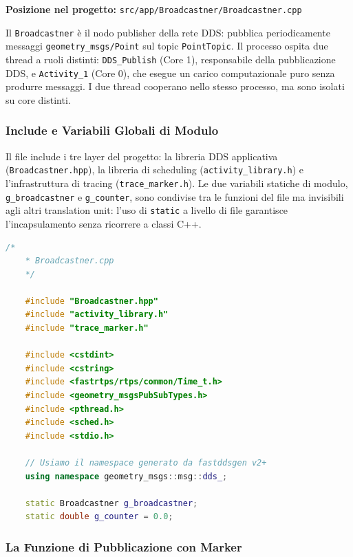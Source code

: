 \noindent\textbf{Posizione nel progetto:} \texttt{src/app/Broadcastner/Broadcastner.cpp}

\bigskip

Il \texttt{Broadcastner} è il nodo publisher della rete DDS: pubblica periodicamente
messaggi \texttt{geometry\_msgs/Point} sul topic \texttt{PointTopic}. Il processo
ospita due thread a ruoli distinti: \texttt{DDS\_Publish} (Core 1), responsabile
della pubblicazione DDS, e \texttt{Activity\_1} (Core 0), che esegue un carico
computazionale puro senza produrre messaggi. I due thread cooperano nello stesso
processo, ma sono isolati su core distinti.

\subsubsection{Include e Variabili Globali di Modulo}

Il file include i tre layer del progetto: la libreria DDS applicativa
(\texttt{Broadcastner.hpp}), la libreria di scheduling
(\texttt{activity\_library.h}) e l'infrastruttura di tracing
(\texttt{trace\_marker.h}). Le due variabili statiche di modulo,
\texttt{g\_broadcastner} e \texttt{g\_counter}, sono condivise tra le funzioni
del file ma invisibili agli altri translation unit: l'uso di \texttt{static}
a livello di file garantisce l'incapsulamento senza ricorrere a classi C++.

\begin{lstlisting}[language=C++, caption={\texttt{Broadcastner.cpp} -- Include e variabili globali di modulo}]
	/*
	* Broadcastner.cpp
	*/
	
	#include "Broadcastner.hpp"
	#include "activity_library.h"
	#include "trace_marker.h"
	
	#include <cstdint>
	#include <cstring>
	#include <fastrtps/rtps/common/Time_t.h>
	#include <geometry_msgsPubSubTypes.h>
	#include <pthread.h>
	#include <sched.h>
	#include <stdio.h>
	
	// Usiamo il namespace generato da fastddsgen v2+
	using namespace geometry_msgs::msg::dds_;
	
	static Broadcastner g_broadcastner;
	static double g_counter = 0.0;
\end{lstlisting}

\subsubsection{La Funzione di Pubblicazione con Marker}

